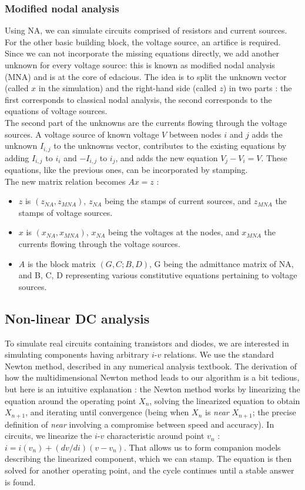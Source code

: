 \documentclass{article}
\begin{document}
\subsubsection{Modified nodal analysis}
Using NA, we can simulate circuits comprised of resistors and current sources. For the other basic building block, the voltage source, an artifice is required. Since we can not incorporate the missing equations directly, we add another unknown for every voltage source: this is known as modified nodal analysis (MNA) and is at the core of edacious. The idea is to split the unknown vector (called $x$ in the simulation) and the right-hand side (called $z$) in two parts : the first corresponds to classical nodal analysis, the second corresponds to the equations of voltage sources.\\
The second part of the unknowns are the currents flowing through the voltage sources. A voltage source of known voltage $V$ between nodes $i$ and $j$ adds the unknown $I_{i,j}$ to the unknowns vector, contributes to the existing equations by adding $I_{i,j}$ to $i_i$ and $-I_{i,j}$ to $i_j$, and adds the new equation $V_j - V_i = V$. These equations, like the previous ones, can be incorporated by stamping.\\
The new matrix relation becomes $Ax = z$ :\\
\begin{itemize}
\item $z$ is $(z_{NA}, z_{MNA})$, $z_{NA}$ being the stamps of current sources, and $z_{MNA}$ the stamps of voltage sources. 
\item $x$ is $(x_{NA}, x_{MNA})$, $x_{NA}$ being the voltages at the nodes, and $x_{MNA}$ the currents flowing through the voltage sources.
\item $A$ is the block matrix $(G,C;B,D)$, G being the admittance matrix of NA, and B, C, D representing various constitutive equations pertaining to voltage sources.
\end{itemize}
\subsection{Non-linear DC analysis}
To simulate real circuits containing transistors and diodes, we are interested in simulating components having arbitrary $i$-$v$ relations. We use the standard Newton method, described in any numerical analysis textbook. The derivation of how the multidimensional Newton method leads to our algorithm is a bit tedious, but here is an intuitive explanation : the Newton method works by linearizing the equation around the operating point $X_n$, solving the linearized equation to obtain $X_{n+1}$, and iterating until convergence (being when $X_n$ is \emph{near} $X_{n+1}$; the precise definition of \emph{near} involving a compromise between speed and accuracy). In circuits, we linearize the $i$-$v$ characteristic around point $v_n$ : $i = i(v_n) + (dv/di)(v - v_n)$. That allows us to form companion models describing the linearized component, which we can stamp. The equation is then solved for another operating point, and the cycle continues until a stable answer is found.
\end{document}
